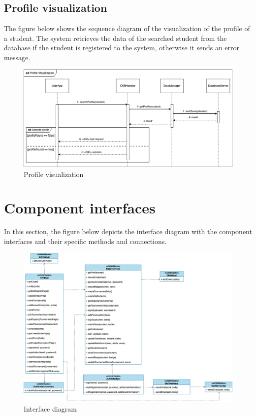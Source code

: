 \subsection{Profile visualization}
The figure below shows the sequence diagram of the visualization of the profile of a student. 
The system retrieves the data of the searched student from the database if the student is registered to the system, otherwise it sends an error message.
\begin{figure}[H]
    \centering
    \includegraphics[width=1\textwidth]{images/seq_diagrams/ProfileVis_DD.png}
    \caption{Profile visualization}
\end{figure}
\clearpage

\section{Component interfaces}
In this section, the figure below depicts the interface diagram with the component interfaces and their specific methods and connections.
\begin{figure}[H]
    \centering
    \includegraphics[width=1\textwidth]{images/Interface_diagram.png}
    \caption{Interface diagram}
\end{figure}
\clearpage

